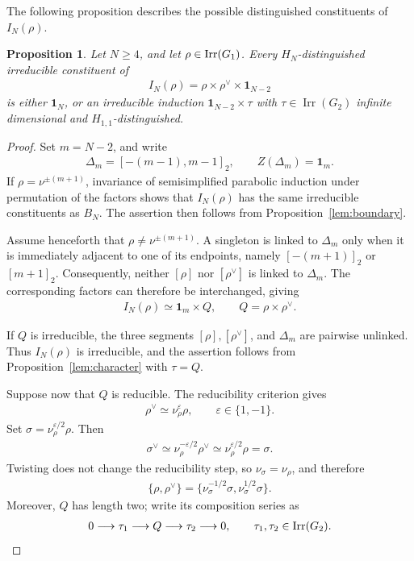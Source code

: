 \documentclass[11pt,leqno]{amsart}
\numberwithin{equation}{section}
\theoremstyle{plain}
\newtheorem{proposition}[theorem]{Proposition}
\theoremstyle{definition}
\theoremstyle{remark}
\DeclareMathOperator{\Irr}{Irr}
\newcommand{\one}{\mathbf{1}}
\newcommand{\seg}[2]{[#1,#2]_2}
\newcommand{\sg}[1]{[#1]_2}
\begin{document}
	The following proposition describes the possible distinguished
	constituents of $I_N(\rho)$.
	\begin{proposition}\label{lem:initial}
		Let $N\ge4$, and let $\rho\in {\rm Irr}(G_1)$.
		Every $H_N$-distinguished irreducible constituent of
		\begin{align*}
			I_N(\rho)=\rho\times\rho^\vee\times\one_{N-2}
		\end{align*}
		is either $\one_N$, or an irreducible induction
		$\one_{N-2}\times\tau$ with $\tau\in\Irr(G_2)$ infinite
		dimensional and $H_{1,1}$-distinguished.
	\end{proposition}
	\begin{proof}
		Set $m=N-2$, and write
		\begin{align*}
			\Delta_m=\seg{-(m-1)}{m-1},
			\qquad Z(\Delta_m)=\one_m.
		\end{align*}
		If $\rho=\nu^{\pm(m+1)}$, invariance of semisimplified
		parabolic induction under permutation of the factors shows that
		$I_N(\rho)$ has the same irreducible constituents as $B_N$.
		The assertion then follows from Proposition~\ref{lem:boundary}.
		
		Assume henceforth that $\rho\ne\nu^{\pm(m+1)}$.
		A singleton is linked to $\Delta_m$ only when it is immediately
		adjacent to one of its endpoints, namely
		$\sg{-(m+1)}$ or $\sg{m+1}$.
		Consequently, neither $[\rho]$ nor $[\rho^\vee]$ is linked to $\Delta_m$.
		The corresponding factors can therefore be interchanged, giving
		\begin{align*}
			I_N(\rho)\simeq\one_m\times Q,
			\qquad Q=\rho\times\rho^\vee.
		\end{align*}
		
		If $Q$ is irreducible, the three segments
		$[\rho],  [\rho^\vee]$, and $\Delta_m$ are pairwise unlinked.
		Thus $I_N(\rho)$ is irreducible, and the assertion follows from Proposition~\ref{lem:character} with $\tau=Q$. 
		
		Suppose now that $Q$ is reducible. The reducibility criterion gives
		\begin{align*}
			\rho^\vee\simeq\nu_\rho^\varepsilon\rho,
			\qquad \varepsilon\in\{1,-1\}.
		\end{align*}
		Set $\sigma=\nu_\rho^{\varepsilon/2}\rho$. Then
		\begin{align*}
			\sigma^\vee
			\simeq\nu_\rho^{-\varepsilon/2}\rho^\vee
			\simeq\nu_\rho^{\varepsilon/2}\rho
			=\sigma.
		\end{align*}
		Twisting does not change the reducibility step, so
		$\nu_\sigma=\nu_\rho$, and therefore
		\begin{align*}
			\{\rho,\rho^\vee\}
			=
			\{\nu_\sigma^{-1/2}\sigma,\nu_\sigma^{1/2}\sigma\}.
		\end{align*}
		Moreover, $Q$ has length two; write its composition series as
		\begin{align*}
			0\longrightarrow\tau_1\longrightarrow Q
			\longrightarrow\tau_2\longrightarrow0,
			\qquad \tau_1,\tau_2\in{\rm Irr}(G_2).
		\end{align*}
		

\end{proof}
\end{document}
